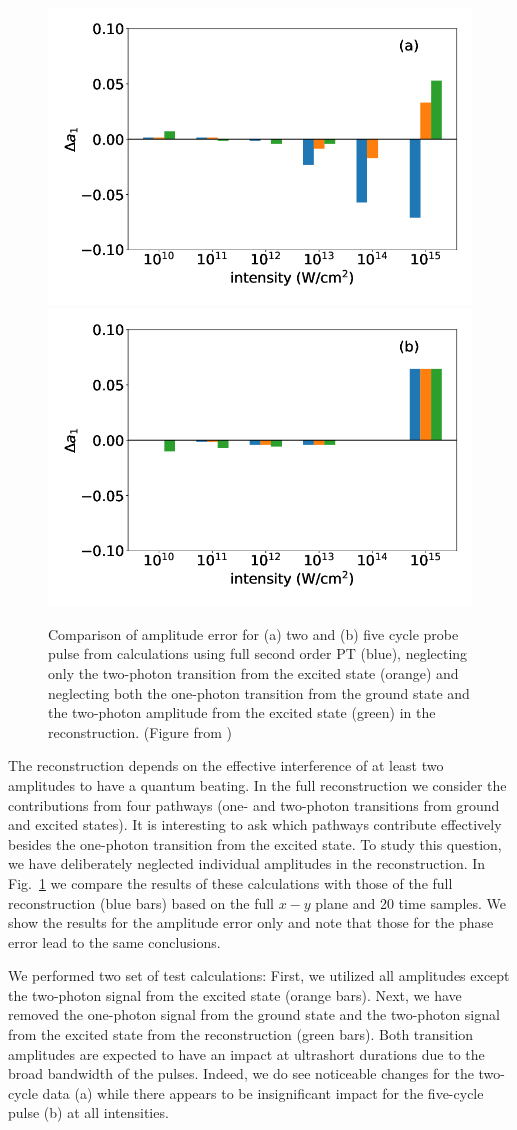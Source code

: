 \begin{figure}[!ht]
\centering
\includegraphics[width=0.49\linewidth]{figs/Photo_ionization/superpositions/Venzke_new_fig_5a.png}
\includegraphics[width=0.49\linewidth]{figs/Photo_ionization/superpositions/Venzke_new_fig_5b.png}
\caption{Comparison of amplitude error for (a) two  and (b) five cycle probe pulse from calculations using full second order PT (blue), neglecting only the two-photon transition from the excited state (orange) and neglecting both the one-photon transition from the ground state and the two-photon amplitude from the excited state (green) in the reconstruction. (Figure from \cite{venzke2021_wave})
} 
  \label{fig:pathways}
\end{figure}

The reconstruction depends on the effective interference of at least two amplitudes to have a quantum beating. In the full reconstruction we consider the contributions from four pathways (one- and two-photon transitions from ground and excited states). It is interesting to ask which pathways contribute effectively besides the one-photon transition from the excited state. To study this question, we have deliberately neglected individual amplitudes in the reconstruction. In Fig.\ \ref{fig:pathways} we compare the results of these calculations with those of the full reconstruction (blue bars) based on the full $x-y$ plane and 20 time samples. We show the results for the amplitude error only and note that those for the phase error lead to the same conclusions.

We performed two set of test calculations: First, we utilized all amplitudes except the two-photon signal from the excited state (orange bars). Next, we have removed the one-photon signal from the ground state and the two-photon signal from the excited state from the reconstruction (green bars). Both transition amplitudes are expected to have an impact at ultrashort durations due to the broad bandwidth of the pulses. Indeed, we do see noticeable changes for the two-cycle data (a) while there appears to be insignificant impact for the five-cycle pulse (b) at all intensities.

